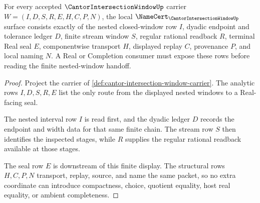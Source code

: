 \begin{theorem}
\label{thm:cantor-intersection-window-namecert-obligations}
For every accepted $\CantorIntersectionWindowUp$ carrier $W=(I,D,S,R,E,H,C,P,N)$, the local $\NameCert_{\CantorIntersectionWindowUp}$ surface consists exactly of the nested closed-window row $I$, dyadic endpoint and tolerance ledger $D$, finite stream window $S$, regular rational readback $R$, terminal Real seal $E$, componentwise transport $H$, displayed replay $C$, provenance $P$, and local naming $N$. A Real or Completion consumer must expose these rows before reading the finite nested-window handoff.
\end{theorem}
\begin{proof}
Project the carrier of \autoref{def:cantor-intersection-window-carrier}. The analytic rows $I,D,S,R,E$ list the only route from the displayed nested windows to a Real-facing seal.

The nested interval row $I$ is read first, and the dyadic ledger $D$ records the endpoint and width data for that same finite chain. The stream row $S$ then identifies the inspected stages, while $R$ supplies the regular rational readback available at those stages.

The seal row $E$ is downstream of this finite display. The structural rows $H,C,P,N$ transport, replay, source, and name the same packet, so no extra coordinate can introduce compactness, choice, quotient equality, host real equality, or ambient completeness.
\end{proof}

